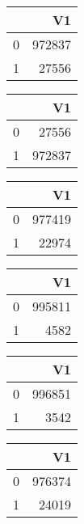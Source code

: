 \bigskip\bigskip
\centering
\begin{tabular}{rr}
  \hline
 & V1 \\ 
  \hline
0 & 972837 \\ 
  1 & 27556 \\ 
   \hline
\end{tabular}

\bigskip\bigskip
\centering
\begin{tabular}{rr}
  \hline
 & V1 \\ 
  \hline
0 & 27556 \\ 
  1 & 972837 \\ 
   \hline
\end{tabular}

\bigskip\bigskip
\centering
\begin{tabular}{rr}
  \hline
 & V1 \\ 
  \hline
0 & 977419 \\ 
  1 & 22974 \\ 
   \hline
\end{tabular}

\bigskip\bigskip
\centering
\begin{tabular}{rr}
  \hline
 & V1 \\ 
  \hline
0 & 995811 \\ 
  1 & 4582 \\ 
   \hline
\end{tabular}

\bigskip\bigskip
\centering
\begin{tabular}{rr}
  \hline
 & V1 \\ 
  \hline
0 & 996851 \\ 
  1 & 3542 \\ 
   \hline
\end{tabular}

\bigskip\bigskip
\centering
\begin{tabular}{rr}
  \hline
 & V1 \\ 
  \hline
0 & 976374 \\ 
  1 & 24019 \\ 
   \hline
\end{tabular}

